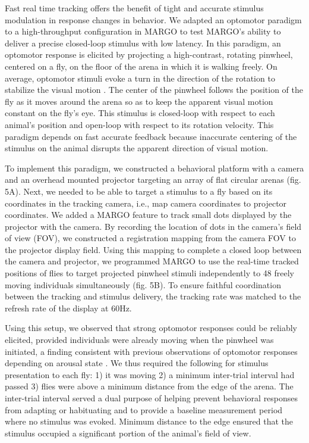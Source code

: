 \documentclass[10pt]{article}
\begin{document}
\begin{multicols}{2}
Fast real time tracking offers the benefit of tight and accurate stimulus modulation in response changes in behavior. We adapted an optomotor paradigm \cite{Fujiwara_A_2017} to a high-throughput configuration in MARGO  to test MARGO's ability to deliver a precise closed-loop stimulus with low latency. In this paradigm, an optomotor response is elicited by projecting a high-contrast, rotating pinwheel, centered on a fly, on the floor of the arena in which it is walking freely. On average, optomotor stimuli evoke a turn in the direction of the rotation to stabilize the visual motion \cite{Gtz_Visual_1973}. The center of the pinwheel follows the position of the fly as it moves around the arena so as to keep the apparent visual motion constant on the fly's eye. This stimulus is closed-loop with respect to each animal's position and open-loop with respect to its rotation velocity. This paradigm depends on fast accurate feedback because inaccurate centering of the stimulus on the animal disrupts the apparent direction of visual motion.

To implement this paradigm, we constructed a behavioral platform with a camera and an overhead mounted projector targeting an array of flat circular arenas (fig. 5A). Next, we needed to be able to target a stimulus to a fly based on its coordinates in the tracking camera, i.e., map camera coordinates to projector coordinates. We added a MARGO feature to track small dots displayed by the projector with the camera. By recording the location of dots in the camera's field of view (FOV), we constructed a registration mapping from the camera FOV to the projector display field. Using this mapping to complete a closed loop between the camera and projector, we programmed MARGO to use the real-time tracked positions of flies to target projected pinwheel stimuli independently to 48 freely moving individuals simultaneously (fig. 5B). To ensure faithful coordination between the tracking and stimulus delivery, the tracking rate was matched to the refresh rate of the display at 60Hz. 

Using this setup, we observed that strong optomotor responses could be reliably elicited, provided individuals were already moving when the pinwheel was initiated, a finding consistent with previous observations of optomotor responses depending on arousal state \cite{Zhu_Peripheral_2009,Kim_Fly_2016}. We thus required the following for stimulus presentation to each fly: 1) it was moving 2) a minimum inter-trial interval had passed 3) flies were above a minimum distance from the edge of the arena. The inter-trial interval served a dual purpose of helping prevent behavioral responses from adapting or habituating and to provide a baseline measurement period where no stimulus was evoked. Minimum distance to the edge ensured that the stimulus occupied a significant portion of the animal's field of view. 


\end{multicols}
\end{document}
